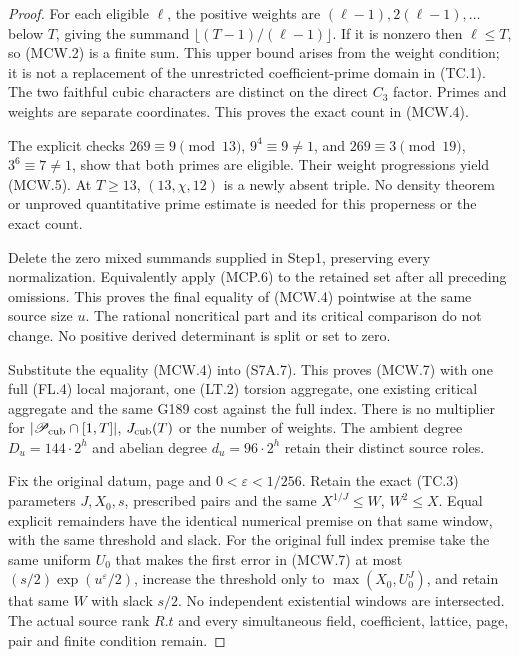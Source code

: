 \begin{proof}
For each eligible $\ell$, the positive weights are
$(\ell-1),2(\ell-1),\ldots$ below $T$, giving the summand
$\lfloor(T-1)/(\ell-1)\rfloor$. If it is nonzero then
$\ell\leq T$, so (MCW.2) is a finite sum. This upper bound
arises from the weight condition; it is not a replacement of
the unrestricted coefficient-prime domain in (TC.1).
The two faithful cubic characters are distinct on the direct
$C_3$ factor. Primes and weights are separate coordinates.
This proves the exact count in (MCW.4).

The explicit checks $269\equiv9\pmod{13}$, $9^4\equiv9\ne1$,
and $269\equiv3\pmod{19}$, $3^6\equiv7\ne1$, show that both
primes are eligible. Their weight progressions yield (MCW.5).
At $T\geq13$, $(13,\chi,12)$ is a newly absent triple.
No density theorem or unproved quantitative prime estimate is
needed for this properness or the exact count.

Delete the zero mixed summands supplied in Step1, preserving
every normalization. Equivalently apply (MCP.6) to the retained
set after all preceding omissions. This proves the final equality
of (MCW.4) pointwise at the same source size $u$.
The rational noncritical part and its critical comparison do
not change. No positive derived determinant is split or set to zero.

Substitute the equality (MCW.4) into (S7A.7).
This proves (MCW.7) with one full (FL.4) local majorant,
one (LT.2) torsion aggregate, one existing critical aggregate
and the same G189 cost against the full index.
There is no multiplier for $|\mathscr P_{\rm cub}\cap[1,T]|$,
$J_{\rm cub}(T)$ or the number of weights.
The ambient degree $D_u=144\cdot2^h$ and abelian degree
$d_u=96\cdot2^h$ retain their distinct source roles.

Fix the original datum, page and $0<\varepsilon<1/256$.
Retain the exact (TC.3) parameters $J,X_0,s$, prescribed pairs
and the same $X^{1/J}\leq W$, $W^2\leq X$.
Equal explicit remainders have the identical numerical premise
on that same window, with the same threshold and slack.
For the original full index premise take the same uniform $U_0$
that makes the first error in (MCW.7) at most
$(s/2)\exp(u^\varepsilon/2)$, increase the threshold only to
$\max(X_0,U_0^J)$, and retain that same $W$ with slack $s/2$.
No independent existential windows are intersected.
The actual source rank $R.t$ and every simultaneous field,
coefficient, lattice, page, pair and finite condition remain.
\end{proof}

